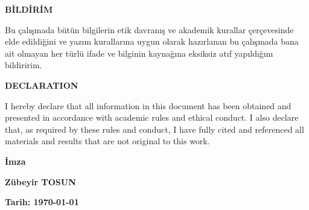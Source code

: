 \begin{center}
\textbf{BİLDİRİM}
\end{center}
\begin{singlespace}%
Bu çalışmada bütün bilgilerin etik davranış ve akademik kurallar çerçevesinde elde edildiğini ve yazım kurallarına uygun olarak hazırlanan bu çalışmada bana ait olmayan her türlü ifade ve bilginin kaynağına eksiksiz atıf yapıldığını bildiririm.
\end{singlespace}
\vspace{2cm}

\begin{center}
\textbf{DECLARATION}
\end{center}
\begin{singlespace}
I hereby declare that all information in this document has been obtained and presented in accordance with academic rules and ethical conduct. I also declare that, as required by these rules and conduct, I have fully cited and referenced all materials and results that are not original to this work.
\end{singlespace}

\vspace{3cm}
\begin{flushright}
\begin{minipage}{5cm}
\begin{center}
\textbf{İmza}

\textbf{Zübeyir TOSUN}

\textbf{Tarih: {\today}}\hfill
\end{center}
\end{minipage}
\end{flushright}

